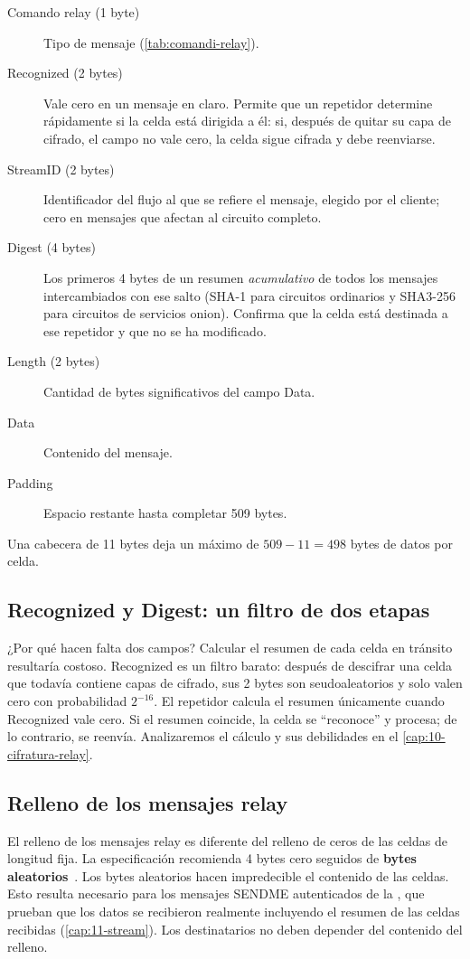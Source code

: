 \begin{description}
  \item[Comando relay (1 byte)] Tipo de mensaje (\cref{tab:comandi-relay}).
  \item[Recognized (2 bytes)] Vale cero en un mensaje en claro. Permite que un repetidor determine rápidamente si la celda está dirigida a él: si, después de quitar su capa de cifrado, el campo no vale cero, la celda sigue cifrada y debe reenviarse.
  \item[StreamID (2 bytes)] Identificador del flujo al que se refiere el mensaje, elegido por el cliente; cero en mensajes que afectan al circuito completo.
  \item[Digest (4 bytes)] Los primeros 4 bytes de un resumen \emph{acumulativo} de todos los mensajes intercambiados con ese salto (SHA-1 para circuitos ordinarios y SHA3-256 para circuitos de servicios onion). Confirma que la celda está destinada a ese repetidor y que no se ha modificado.
  \item[Length (2 bytes)] Cantidad de bytes significativos del campo Data.
  \item[Data] Contenido del mensaje.
  \item[Padding] Espacio restante hasta completar 509 bytes.
\end{description}

Una cabecera de 11 bytes deja un máximo de $509 - 11 = 498$ bytes de datos por celda.

\subsection{Recognized y Digest: un filtro de dos etapas}

¿Por qué hacen falta dos campos? Calcular el resumen de cada celda en tránsito resultaría costoso. Recognized es un filtro barato: después de descifrar una celda que todavía contiene capas de cifrado, sus 2 bytes son seudoaleatorios y solo valen cero con probabilidad $2^{-16}$. El repetidor calcula el resumen únicamente cuando Recognized vale cero. Si el resumen coincide, la celda se \enquote{reconoce} y procesa; de lo contrario, se reenvía. Analizaremos el cálculo y sus debilidades en el \cref{cap:10-cifratura-relay}.

\subsection{Relleno de los mensajes relay}

El relleno de los mensajes relay es diferente del relleno de ceros de las celdas de longitud fija. La especificación recomienda 4 bytes cero seguidos de \textbf{bytes aleatorios}~. Los bytes aleatorios hacen impredecible el contenido de las celdas. Esto resulta necesario para los mensajes SENDME autenticados de la , que prueban que los datos se recibieron realmente incluyendo el resumen de las celdas recibidas (\cref{cap:11-stream}). Los destinatarios no deben depender del contenido del relleno.

